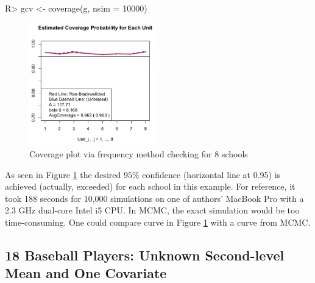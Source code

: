 \documentclass[article]{jss}
\begin{document}
\begin{CodeChunk}
\begin{CodeInput}
R> gcv <- coverage(g, nsim = 10000)
\end{CodeInput}
\end{CodeChunk}
\begin{figure}[h] 
\begin{center}
\includegraphics[width = 5.5cm]{school2.png}
\caption{Coverage plot via frequency method checking for 8 schools}
\label{fig:schoolcoverage}
\end{center}
\end{figure}

As seen in Figure \ref{fig:schoolcoverage} the desired $95\%$ confidence (horizontal line at 0.95) is achieved (actually, exceeded) for each school in this example. For reference, it took 188 seconds for 10,000 simulations  on one of authors' MacBook Pro with a 2.3 GHz dual-core Intel i5 CPU. In MCMC, the exact simulation would be too time-consuming. One could compare curve in Figure \ref{fig:schoolcoverage} with a curve from MCMC.



\subsection[Unknown Second-level Mean and One Covariate]{18 Baseball Players: Unknown Second-level Mean and One Covariate}
\end{document}
